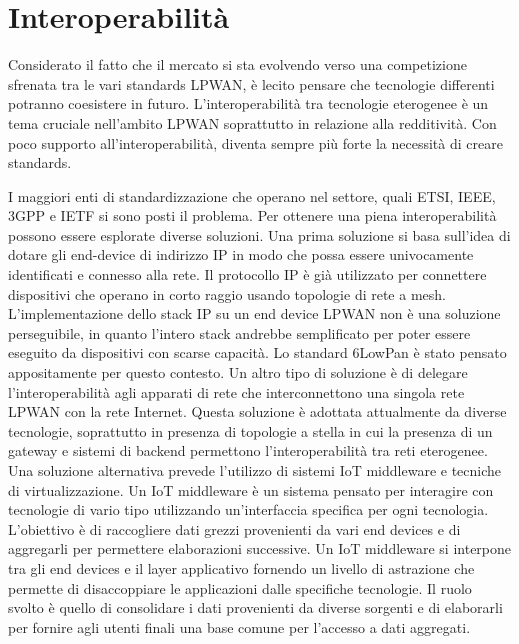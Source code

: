 \documentclass[12pt,a4paper,openright,twoside]{report}
\begin{document}
\section{Interoperabilit\`a}
Considerato il fatto che il mercato si sta evolvendo verso una competizione sfrenata tra le vari standards LPWAN, \`e lecito pensare che tecnologie differenti potranno coesistere in futuro.
L'interoperabilit\`a tra tecnologie eterogenee \`e un tema cruciale nell'ambito LPWAN soprattutto in relazione alla redditivit\`a. Con poco supporto all'interoperabilit\`a, diventa sempre pi\`u forte la necessit\`a di creare standards.

I maggiori enti di standardizzazione che operano nel settore, quali ETSI, IEEE, 3GPP e IETF si sono posti il problema.  
Per ottenere una piena interoperabilit\`a possono essere esplorate diverse soluzioni. 
Una prima soluzione si basa sull'idea di dotare gli end-device di indirizzo IP in modo che possa essere univocamente identificati e connesso alla rete. Il protocollo IP \`e gi\`a utilizzato per connettere dispositivi che operano in corto raggio usando topologie di rete a mesh. 
L'implementazione dello stack IP su un end device LPWAN non \`e una soluzione perseguibile, in quanto l'intero stack andrebbe semplificato per poter essere eseguito da dispositivi con scarse capacit\`a. Lo standard 6LowPan \`e stato pensato appositamente per questo contesto.
Un altro tipo di soluzione \`e di delegare l'interoperabilit\`a agli apparati di rete che interconnettono una singola rete LPWAN con la rete Internet. 
Questa soluzione \`e adottata attualmente da diverse tecnologie, soprattutto in presenza di topologie a stella in cui la presenza di un gateway e sistemi di backend permettono l'interoperabilit\`a tra reti eterogenee.
Una soluzione alternativa prevede l'utilizzo di sistemi IoT middleware e tecniche di virtualizzazione. 
Un IoT middleware \`e un sistema pensato per interagire con tecnologie di vario tipo utilizzando un'interfaccia specifica per ogni tecnologia. L'obiettivo \`e di raccogliere dati grezzi provenienti da vari end devices e di aggregarli per permettere elaborazioni successive. 
Un IoT middleware si interpone tra gli end devices e il layer applicativo fornendo un livello di astrazione che permette di disaccoppiare le applicazioni dalle specifiche tecnologie.  
Il ruolo svolto \`e quello di consolidare i dati provenienti da diverse sorgenti e di elaborarli per fornire agli utenti finali una base comune per l'accesso a dati aggregati. 
\end{document}
